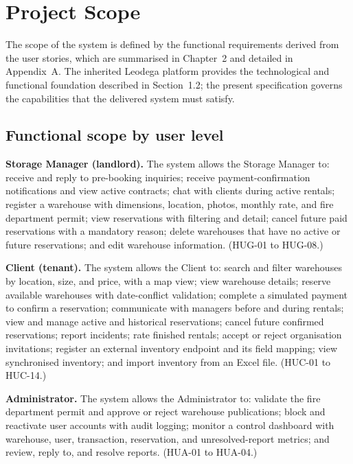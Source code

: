 \documentclass[11pt,a4paper,oneside]{report}
\begin{document}
\section{Project Scope}

The scope of the system is defined by the functional requirements derived from the user stories, which are summarised in Chapter~2 and detailed in Appendix~A. The inherited Leodega platform provides the technological and functional foundation described in Section~1.2; the present specification governs the capabilities that the delivered system must satisfy.

\subsection*{Functional scope by user level}

\textbf{Storage Manager (landlord).} The system allows the Storage Manager to: receive and reply to pre-booking inquiries; receive payment-confirmation notifications and view active contracts; chat with clients during active rentals; register a warehouse with dimensions, location, photos, monthly rate, and fire department permit; view reservations with filtering and detail; cancel future paid reservations with a mandatory reason; delete warehouses that have no active or future reservations; and edit warehouse information. (HUG-01 to HUG-08.)

\textbf{Client (tenant).} The system allows the Client to: search and filter warehouses by location, size, and price, with a map view; view warehouse details; reserve available warehouses with date-conflict validation; complete a simulated payment to confirm a reservation; communicate with managers before and during rentals; view and manage active and historical reservations; cancel future confirmed reservations; report incidents; rate finished rentals; accept or reject organisation invitations; register an external inventory endpoint and its field mapping; view synchronised inventory; and import inventory from an Excel file. (HUC-01 to HUC-14.)

\textbf{Administrator.} The system allows the Administrator to: validate the fire department permit and approve or reject warehouse publications; block and reactivate user accounts with audit logging; monitor a control dashboard with warehouse, user, transaction, reservation, and unresolved-report metrics; and review, reply to, and resolve reports. (HUA-01 to HUA-04.)
\end{document}
